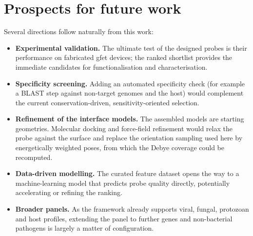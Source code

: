 \section{Prospects for future work}

Several directions follow naturally from this work:

\begin{itemize}
  \item \textbf{Experimental validation.} The ultimate test of the designed probes is their
        performance on fabricated \acrshort{gfet} devices; the ranked shortlist provides the
        immediate candidates for functionalisation and characterisation.
  \item \textbf{Specificity screening.} Adding an automated specificity check (for example a
        BLAST step against non-target genomes and the host) would complement the current
        conservation-driven, sensitivity-oriented selection.
  \item \textbf{Refinement of the interface models.} The assembled models are starting
        geometries. Molecular docking and force-field refinement would relax the probe against
        the surface and replace the orientation sampling used here by energetically weighted
        poses, from which the Debye coverage could be recomputed.
  \item \textbf{Data-driven modelling.} The curated feature dataset opens the way to a
        machine-learning model that predicts probe quality directly, potentially accelerating or
        refining the ranking.
  \item \textbf{Broader panels.} As the framework already supports viral, fungal, protozoan and
        host profiles, extending the panel to further genes and non-bacterial pathogens is
        largely a matter of configuration.
\end{itemize}
